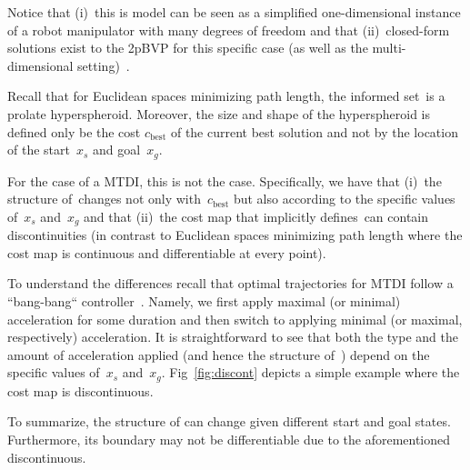 \documentclass[letterpaper, 10 pt, conference]{ieeeconf}  %
\begin{document}
Notice that 
(i)~this is model can be seen as a simplified one-dimensional instance of a robot manipulator with many degrees of freedom and that
(ii)~closed-form solutions exist to the 2pBVP for this specific case (as well as the multi-dimensional setting)~\cite{HN10, KS14}.

%
%
Recall that for Euclidean spaces minimizing path length, the informed set~\Cinf is a prolate hyperspheroid.
Moreover, the size and shape of the hyperspheroid is defined only be the cost $c_{\text{best}}$ of the current best solution and not by the location of the start~$x_s$ and goal~$x_g$.

For the case of a MTDI, this is not the case. 
Specifically, we have that 
(i)~the structure of~\Cinf changes not only with~$c_{\text{best}}$ but also according to the specific values of~$x_s$ and~$x_g$ 
and that
(ii)~the cost map that implicitly defines~\Cinf can contain discontinuities (in contrast to Euclidean spaces minimizing path length where the cost map is continuous and differentiable at every point).

To understand the differences recall that optimal trajectories  for MTDI follow a ``bang-bang`` controller~\cite{HN10, KS14}.
Namely, we first apply maximal (or minimal) acceleration for some duration and then switch to applying minimal (or maximal, respectively) acceleration.
It is straightforward to see that both the type and the amount of acceleration applied (and hence the structure of~\Cinf) depend on the specific values of~$x_s$ and~$x_g$. 
Fig~\ref{fig:discont} depicts a simple example where the cost map is discontinuous.

To summarize, the structure of \Cinf can change given different start and goal states.
Furthermore,  its boundary may not be  differentiable due to the aforementioned discontinuous. 
\end{document}
